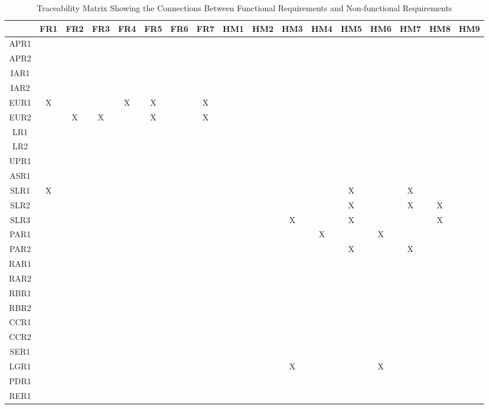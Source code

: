 \documentclass[12pt]{article}
\begin{document}
\begin{landscape}
\begin{table}[h!]
\centering
\begin{tabular}{|c|c|c|c|c|c|c|c|c|c|c|c|c|c|c|c|c|}
\hline
	& FR1 & FR2 & FR3 & FR4 & FR5 & FR6 & FR7 & HM1 & HM2 & HM3 & HM4 & HM5 & HM6 & HM7 & HM8 & HM9 \\
\hline
APR1        & & & & & & & & & & & & & & & & \\ \hline
APR2        & & & & & & & & & & & & & & & &  \\ \hline
IAR1        & & & & & & & & & & & & & & & & \\ \hline
IAR2        & & & & & & & & & & & & & & & & \\ \hline
EUR1        &X & & &X &X & &X & & & & & & & & & \\ \hline
EUR2        & &X &X & &X & &X & & & & & & & & & \\ \hline
LR1         & & & & & & & & & & & & & & & & \\ \hline
LR2         & & & & & & & & & & & & & & & & \\ \hline
UPR1        & & & & & & & & & & & & & & & & \\ \hline
ASR1        & & & & & & & & & & & & & & & & \\ \hline
SLR1        & X& & & & & & & & & & & X& & X& & \\ \hline
SLR2        & & & & & & & & & & & & X& & X& X& \\ \hline
SLR3        & & & & & & & & & & X& & X& & & X& \\ \hline
PAR1        & & & & & & & & & & & X& & X& & & \\ \hline
PAR2        & & & & & & & & & & & & X& & X& & \\ \hline
RAR1        & & & & & & & & & & & & & & & & \\ \hline
RAR2        & & & & & & & & & & & & & & & & \\ \hline
RBR1        & & & & & & & & & & & & & & & & \\ \hline
RBR2        & & & & & & & & & & & & & & & & \\ \hline
CCR1        & & & & & & & & & & & & & & & & \\ \hline
CCR2        & & & & & & & & & & & & & & & & \\ \hline
SER1        & & & & & & & & & & & & & & & & \\ \hline
LGR1        & & & & & & & & & & X & & & X& & & \\ \hline
PDR1        & & & & & & & & & & & & & & & & \\ \hline
RER1        & & & & & & & & & & & & & & & & \\ \hline

\end{tabular}
\caption{Traceability Matrix Showing the Connections Between Functional Requirements and Non-functional Requirements}
\label{Table:A_trace}
\end{table}
\end{landscape}
\end{document}
